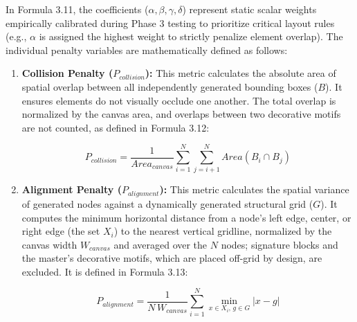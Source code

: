 \begin{refsection}
In Formula 3.11, the coefficients ($\alpha, \beta, \gamma, \delta$) represent static scalar weights empirically calibrated during Phase 3 testing to prioritize critical layout rules (e.g., $\alpha$ is assigned the highest weight to strictly penalize element overlap). The individual penalty variables are mathematically defined as follows:

\begin{enumerate}
    \item \textbf{Collision Penalty ($P_{collision}$):} This metric calculates the absolute area of spatial overlap between all independently generated bounding boxes ($B$). It ensures elements do not visually occlude one another. The total overlap is normalized by the canvas area, and overlaps between two decorative motifs are not counted, as defined in Formula 3.12:

    \begin{center}
    \begin{minipage}{0.8\textwidth}
    \begin{equation}
    P_{collision} = \frac{1}{Area_{canvas}} \sum_{i=1}^{N} \sum_{j=i+1}^{N} Area(B_i \cap B_j)
    \end{equation}
    \centering
    \end{minipage}
    \end{center}
	
	\item \textbf{Alignment Penalty ($P_{alignment}$):} This metric calculates the spatial variance of generated nodes against a dynamically generated structural grid ($G$). It computes the minimum horizontal distance from a node's left edge, center, or right edge (the set $X_i$) to the nearest vertical gridline, normalized by the canvas width $W_{canvas}$ and averaged over the $N$ nodes; signature blocks and the master's decorative motifs, which are placed off-grid by design, are excluded. It is defined in Formula 3.13:
    
    \begin{center}
    \begin{minipage}{0.8\textwidth}
    \begin{equation}
    P_{alignment} = \frac{1}{N \, W_{canvas}} \sum_{i=1}^{N} \min_{x \in X_i,\, g \in G} | x - g |
    \end{equation}
    \centering
    \end{minipage}
    \end{center}


\end{enumerate}
\end{refsection}
